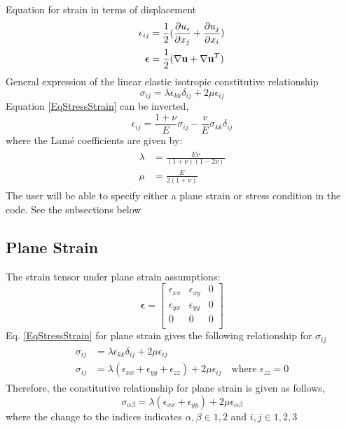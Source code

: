 \documentclass[12pt,3p]{article}
\begin{document}
Equation for strain in terms of displacement
\begin{subequations}\label{Strain}
\begin{align}
\epsilon_{ij} &= \frac{1}{2} (\pdv{u_i}{x_j} + \pdv{u_j}{x_i}) \\
 \bm{\epsilon} &= \frac{1}{2} (\nabla \mathbf{u} + \nabla \mathbf{u}^T)
\end{align}
\end{subequations}
General expression of the linear elastic isotropic constitutive relationship 
\begin{equation}\label{EqStressStrain}
\sigma_{ij} = \lambda \epsilon_{kk} \delta_{ij} + 2 \mu \epsilon_{ij}
\end{equation}
Equation \ref{EqStressStrain} can be inverted,
\begin{equation}\label{EqStrainStress}
\epsilon_{ij} = \frac{1+ \nu}{E} \sigma_{ij} - \frac{v}{E} \sigma_{kk} \delta_{ij}
\end{equation}
where the Lamé coefficients are given by: 
\begin{align}\label{EqLame}
\begin{split}
\lambda &= \frac{E \nu}{(1+ \nu) (1 - 2 \nu)} \\
\mu &= \frac{E}{2 (1+ \nu)}
\end{split}
\end{align}
The user will be able to specify either a plane strain or stress condition in the code. See the subsections below 

\subsection{Plane Strain}
The strain tensor under plane strain assumptions: 
\begin{equation*}
\bm{\epsilon} = 
\begin{bmatrix}
\epsilon_{xx} & \epsilon_{xy} & 0 \\
\epsilon_{yx} & \epsilon_{yy} & 0 \\
0 & 0 & 0 \\
\end{bmatrix}
\end{equation*}
Eq. \ref{EqStressStrain} for plane strain gives the following relationship for $\sigma_{ij}$
\begin{align}\label{EqPlaneStrain}
\begin{split}
\sigma_{ij} &= \lambda \epsilon_{kk} \delta_{ij} + 2 \mu \epsilon_{ij} \\
\sigma_{ij} &= \lambda (\epsilon_{xx} + \epsilon_{yy} + \epsilon_{zz}) + 2 \mu \epsilon_{ij} \quad \text{where } \epsilon_{zz} = 0 
\end{split}
\end{align}
Therefore, the constitutive relationship for plane strain is given as follows, 
\begin{equation}\label{EqPlaneStrain}
\sigma_{\alpha \beta} = \lambda (\epsilon_{xx} + \epsilon_{yy}) + 2 \mu \epsilon_{\alpha \beta} 
\end{equation}
where the change to the indices indicates $\alpha, \beta \in 1, 2$ and $i, j \in 1, 2, 3$
\end{document}
